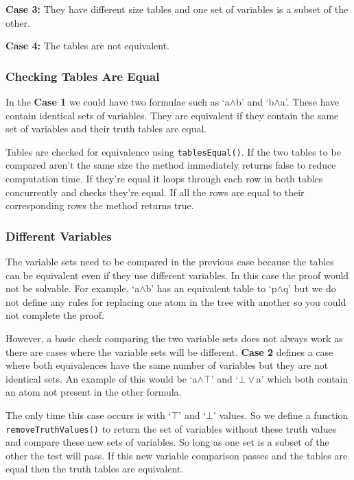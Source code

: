 \documentclass{report}
\begin{document}
\textbf{Case 3: } They have different size tables and one set of variables is a subset of the other.

\textbf{Case 4: } The tables are not equivalent.

\subsubsection{Checking Tables Are Equal}

In the \textbf{Case 1} we could have two formulae such as `a$\land$b' and `b$\land$a'. These have contain identical sets of variables. They are equivalent if they contain the same set of variables and their truth tables are equal.

Tables are checked for equivalence using {\tt tablesEqual()}. If the two tables to be compared aren't the same size the method immediately returns false to reduce computation time. If they're equal it loops through each row in both tables concurrently and checks they're equal. If all the rows are equal to their corresponding rows the method returns true.

\subsubsection{Different Variables}

The variable sets need to be compared in the previous case because the tables can be equivalent even if they use different variables. In this case the proof would not be solvable. For example, `a$\land$b' has an equivalent table to `p$\land$q' but we do not define any rules for replacing one atom in the tree with another so you could not complete the proof.

However, a basic check comparing the two variable sets does not always work as there are cases where the variable sets will be different. \textbf{Case 2} defines a case where both equivalences have the same number of variables but they are not identical sets. An example of this would be `a$\land\top$' and `$\bot\lor$a' which both contain an atom not present in the other formula. 

The only time this case occurs is with `$\top$' and `$\bot$' values. So we define a function {\tt removeTruthValues()} to return the set of variables without these truth values and compare these new sets of variables. So long as one set is a subset of the other the test will pass. If this new variable comparison passes and the tables are equal then the truth tables are equivalent.
\end{document}
